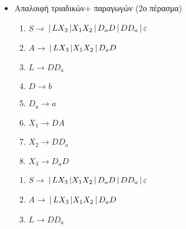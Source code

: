 \begin{tcolorbox}[colback=yellow!15!white, colframe=blue!50!white,
	fonttitle=\bfseries\Large, title = Μετατροπή $CFG\rightarrow CNF$ 3/3]

	\begin{itemize}
			\item Απαλοιφή τριαδικών+ παραγωγών (2ο πέρασμα)
	\reducevspace\reducevspace\reducevspace\reducevspace\reducevspace\reducevspace\reducevspace

	\begin{minipage}[t]{0.5\textwidth}
		\begin{enumerate}
			\item $S\rightarrow$\textcolor{purple}{}$\,|\, LX_3 \,|\\
			 X_1X_2\,|\, D_aD \,|\, DD_a \,|\, \varepsilon$

			\item $A\rightarrow$\textcolor{purple}{}$\,|\, LX_3 \,|\\
			X_1X_2 \,|\, D_aD$

			\item $L\rightarrow DD_a$

			\item $D\rightarrow b$

			\item $D_a\rightarrow a$

			\item $X_1\rightarrow DA$

			\item $X_2\rightarrow DD_a$

			\item $X_3\rightarrow D_aD$
		\end{enumerate}
	\end{minipage}%
	\hfill
	\begin{minipage}[t]{0.5\textwidth}
		\begin{enumerate}
			\item $S\rightarrow$\textcolor{violet}{}$\,|\, LX_3 \,|\\
			X_1X_2 \,|\, D_aD \,|\, DD_a \,|\, \varepsilon$

			\item $A\rightarrow$\textcolor{violet}{}$\,|\, LX_3 \,|\\
			X_1X_2 \,|\, D_aD$

			\item $L\rightarrow DD_a$


\end{enumerate}
\end{minipage}
\end{itemize}
\end{tcolorbox}
